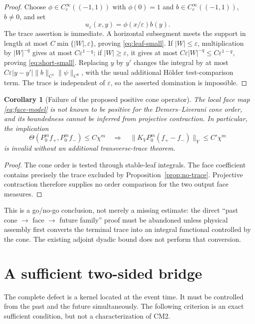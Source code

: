 \documentclass[11pt]{article}
\newtheorem{corollary}[theorem]{Corollary}
\begin{document}
\begin{proof}
Choose $\phi\in C_c^\infty((-1,1))$ with $\phi(0)=1$ and
$b\in C_c^\infty((-1,1))$, $b\ne0$, and set
\[
  u_\varepsilon(x,y)=\phi(x/\varepsilon)b(y).
\]
The trace assertion is immediate.  A horizontal subsegment meets the support
in length at most $C\min\{|W|,\varepsilon\}$, proving
\eqref{eq:leaf-small}.  If $|W|\le\varepsilon$, multiplication by
$|W|^{-q}$ gives at most $C\varepsilon^{1-q}$; if
$|W|\ge\varepsilon$, it gives at most
$C\varepsilon|W|^{-q}\le C\varepsilon^{1-q}$, proving
\eqref{eq:short-small}.  Replacing $y$ by $y'$ changes the integral by at most
$C\varepsilon|y-y'|\|b\|_{C^1}\|\psi\|_{C^0}$, with the usual additional
H\"older test-comparison term.  The trace is independent of
$\varepsilon$, so the asserted domination is impossible.
\end{proof}

\begin{corollary}[Failure of the proposed positive cone operator]
The local face map \eqref{eq:face-model} is not known to be positive for the
Demers--Liverani cone order, and its boundedness cannot be inferred from
projective contraction.  In particular, the implication
\[
 \Theta(P_0^mf_+,P_0^mf_-)\le C\chi^m
 \quad\Longrightarrow\quad
 \|K_VP_0^m(f_+-f_-)\|_Y\le C'\chi^m
\]
is invalid without an additional transverse-trace theorem.
\end{corollary}

\begin{proof}
The cone order is tested through stable-leaf integrals.  The face coefficient
contains precisely the trace excluded by Proposition~\ref{prop:no-trace}.
Projective contraction therefore supplies no order comparison for the two
output face measures.
\end{proof}

This is a go/no-go conclusion, not merely a missing estimate: the direct
``past cone $\to$ face $\to$ future family'' proof must be abandoned unless
physical assembly first converts the terminal trace into an integral
functional controlled by the cone.  The existing adjoint dyadic bound does
not perform that conversion.

\section{A sufficient two-sided bridge}

The complete defect is a kernel located at the event time.  It must be
controlled from the past and the future simultaneously.  The following
criterion is an exact sufficient condition, but not a characterization of
CM2.
\end{document}
